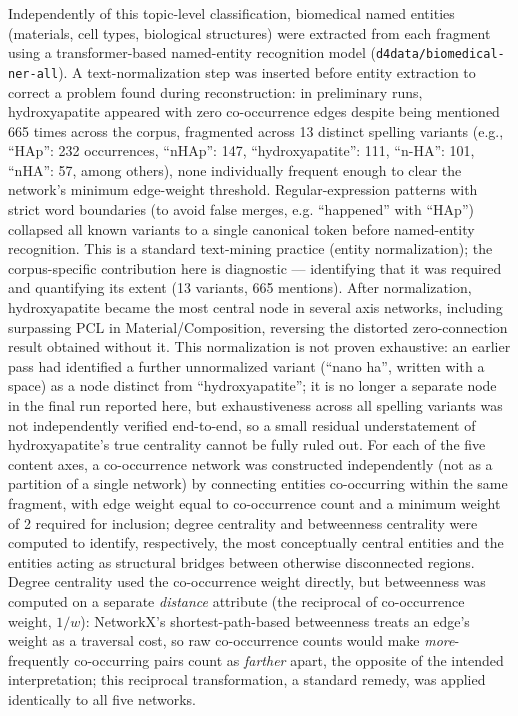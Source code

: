 \documentclass[5p,times,twocolumn]{elsarticle}
\begin{document}
Independently of this topic-level classification, biomedical named entities (materials, cell types, biological structures) were extracted from each fragment using a transformer-based named-entity recognition model (\texttt{d4data/biomedical-ner-all}). A text-normalization step was inserted before entity extraction to correct a problem found during reconstruction: in preliminary runs, hydroxyapatite appeared with zero co-occurrence edges despite being mentioned 665 times across the corpus, fragmented across 13 distinct spelling variants (e.g., ``HAp'': 232 occurrences, ``nHAp'': 147, ``hydroxyapatite'': 111, ``n-HA'': 101, ``nHA'': 57, among others), none individually frequent enough to clear the network's minimum edge-weight threshold. Regular-expression patterns with strict word boundaries (to avoid false merges, e.g. ``happened'' with ``HAp'') collapsed all known variants to a single canonical token before named-entity recognition. This is a standard text-mining practice (entity normalization); the corpus-specific contribution here is diagnostic --- identifying that it was required and quantifying its extent (13 variants, 665 mentions). After normalization, hydroxyapatite became the most central node in several axis networks, including surpassing PCL in Material/Composition, reversing the distorted zero-connection result obtained without it. This normalization is not proven exhaustive: an earlier pass had identified a further unnormalized variant (``nano ha'', written with a space) as a node distinct from ``hydroxyapatite''; it is no longer a separate node in the final run reported here, but exhaustiveness across all spelling variants was not independently verified end-to-end, so a small residual understatement of hydroxyapatite's true centrality cannot be fully ruled out. For each of the five content axes, a co-occurrence network was constructed independently (not as a partition of a single network) by connecting entities co-occurring within the same fragment, with edge weight equal to co-occurrence count and a minimum weight of 2 required for inclusion; degree centrality and betweenness centrality were computed to identify, respectively, the most conceptually central entities and the entities acting as structural bridges between otherwise disconnected regions. Degree centrality used the co-occurrence weight directly, but betweenness was computed on a separate \emph{distance} attribute (the reciprocal of co-occurrence weight, $1/w$): NetworkX's shortest-path-based betweenness treats an edge's weight as a traversal cost, so raw co-occurrence counts would make \emph{more}-frequently co-occurring pairs count as \emph{farther} apart, the opposite of the intended interpretation; this reciprocal transformation, a standard remedy, was applied identically to all five networks.
\end{document}
